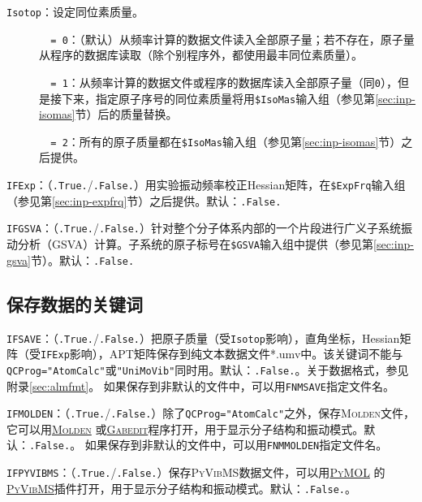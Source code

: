 \documentclass[12pt,a4paper,openany,twoside,cap,UTF8]{ctexbook}
\begin{document}
\bigskip{}\noindent
\verb|Isotop|：设定同位素质量。
\begin{description}
\item[ ]\verb|  = 0|：（默认）从频率计算的数据文件读入全部原子量；若不存在，原子量从程序的数据库读取（除个别程序外，都使用最丰同位素质量）。
\item[ ]\verb|  = 1|：从频率计算的数据文件或程序的数据库读入全部原子量（同\verb|0|），但是接下来，指定原子序号的同位素质量将用\verb|$IsoMas|输入组（参见第\ref{sec:inp-isomas}节）后的质量替换。
\item[ ]\verb|  = 2|：所有的原子质量都在\verb|$IsoMas|输入组（参见第\ref{sec:inp-isomas}节）之后提供。
\end{description}

\bigskip{}\noindent
\verb|IFExp|：（\verb|.True.|/\verb|.False.|）用实验振动频率校正Hessian矩阵，在\verb|$ExpFrq|输入组（参见第\ref{sec:inp-expfrq}节）之后提供。默认：\verb|.False.|

\bigskip{}\noindent
\verb|IFGSVA|：（\verb|.True.|/\verb|.False.|）针对整个分子体系内部的一个片段进行广义子系统振动分析（GSVA）计算。子系统的原子标号在\verb|$GSVA|输入组中提供（参见第\ref{sec:inp-gsva}节）。默认：\verb|.False.|


\subsection{保存数据的关键词} \label{subsec:inp-qcdata-save}

\bigskip{}\noindent
\verb|IFSAVE|：（\verb|.True.|/\verb|.False.|）把原子质量（受\verb|Isotop|影响），直角坐标，Hessian矩阵（受\verb|IFExp|影响），APT矩阵保存到纯文本数据文件*.umv中。该关键词不能与\verb|QCProg="AtomCalc"|或\verb|"UniMoVib"|同时用。默认：\verb|.False.|。关于数据格式，参见附录\ref{sec:almfmt}。
如果保存到非默认的文件中，可以用\verb|FNMSAVE|指定文件名。

\bigskip{}\noindent
\verb|IFMOLDEN|：（\verb|.True.|/\verb|.False.|）除了\verb|QCProg="AtomCalc"|之外，保存\textsc{Molden}文件，它可以用\href{https://www.theochem.ru.nl/molden/}{\textsc{Molden}} 或\href{http://gabedit.sourceforge.net/}{\textsc{Gabedit}}程序打开，用于显示分子结构和振动模式。默认：\verb|.False.|。
如果保存到非默认的文件中，可以用\verb|FNMMOLDEN|指定文件名。

\bigskip{}\noindent
\verb|IFPYVIBMS|：（\verb|.True.|/\verb|.False.|）保存\textsc{PyVibMS}数据文件，可以用\href{https://pymol.org/}{\textsc{PyMOL}}
的\href{https://github.com/smutao/PyVibMS}{\textsc{PyVibMS}}插件打开，用于显示分子结构和振动模式。默认：\verb|.False.|。
\end{document}
